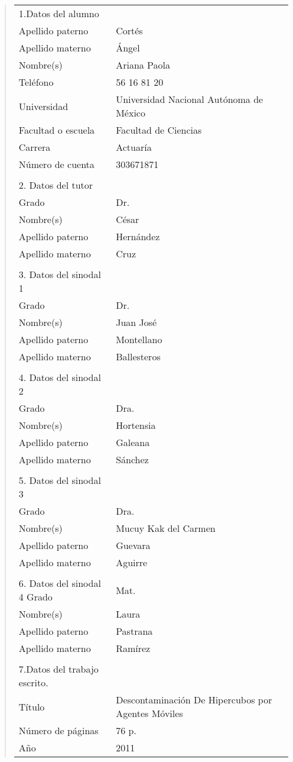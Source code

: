 \begin{quote}
\begin{tabular}{lll}
1.Datos del alumno&{}\\
Apellido paterno&Cort\'es\\
Apellido materno&\'Angel\\
Nombre(s)&Ariana Paola\\
Tel\'efono&56 16 81 20\\
Universidad&Universidad Nacional Aut\'onoma de M\'exico\\
Facultad o escuela&Facultad de Ciencias\\
Carrera&Actuar\'ia\\
N\'umero de cuenta&303671871\\
{}&{}\\
2. Datos del tutor&{}\\
Grado&Dr.\\
Nombre(s)& C\'esar\\
Apellido paterno&Hern\'andez\\
Apellido materno&Cruz\\
{}&{}\\
3. Datos del sinodal 1&{}\\
Grado&Dr.\\
Nombre(s)&Juan Jos\'e\\
Apellido paterno&Montellano\\
Apellido materno&Ballesteros\\
{}&{}\\
4. Datos del sinodal 2&{}\\
Grado&Dra.\\
Nombre(s)&Hortensia\\
Apellido paterno&Galeana\\
Apellido materno&S\'anchez\\
{}&{}\\
5. Datos del sinodal 3&{}\\
Grado&Dra.\\
Nombre(s)&Mucuy Kak del Carmen\\
Apellido paterno&Guevara\\
Apellido materno&Aguirre\\
{}&{}\\
6. Datos del sinodal 4
Grado&Mat.\\
Nombre(s)&Laura\\
Apellido paterno&Pastrana\\
Apellido materno&Ram\'irez\\
{}&{}\\
7.Datos del trabajo escrito.&{}\\
T\'itulo&Descontaminaci\'on De Hipercubos por Agentes M\'oviles\\
N\'umero de p\'aginas&76 p.\\
A\~no&2011\\
\end{tabular}
\end{quote}


\newpage

\begin{tabular}{lll}
\end{tabular}